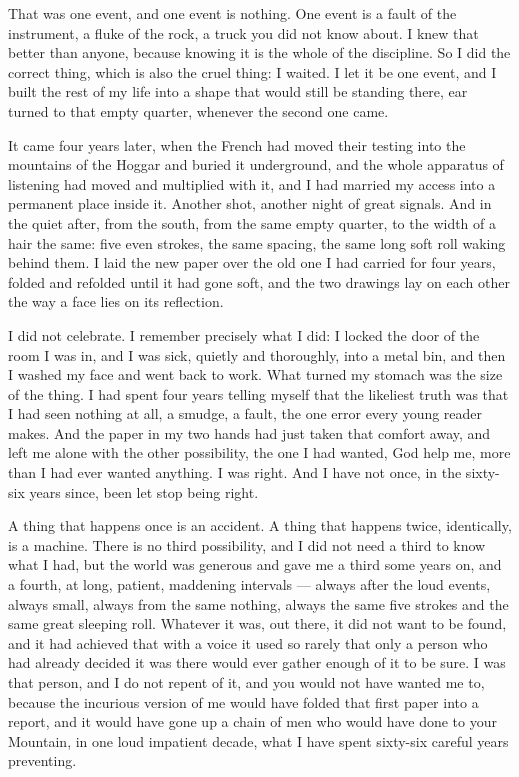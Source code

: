 \ornament

That was one event, and one event is nothing. One event is a fault of the instrument, a fluke of the rock, a truck you did not know about. I knew that better than anyone, because knowing it is the whole of the discipline. So I did the correct thing, which is also the cruel thing: I waited. I let it be one event, and I built the rest of my life into a shape that would still be standing there, ear turned to that empty quarter, whenever the second one came.\par

It came four years later, when the French had moved their testing into the mountains of the Hoggar and buried it underground, and the whole apparatus of listening had moved and multiplied with it, and I had married my access into a permanent place inside it. Another shot, another night of great signals. And in the quiet after, from the south, from the same empty quarter, to the width of a hair the same: five even strokes, the same spacing, the same long soft roll waking behind them. I laid the new paper over the old one I had carried for four years, folded and refolded until it had gone soft, and the two drawings lay on each other the way a face lies on its reflection.\par

I did not celebrate. I remember precisely what I did: I locked the door of the room I was in, and I was sick, quietly and thoroughly, into a metal bin, and then I washed my face and went back to work. What turned my stomach was the size of the thing. I had spent four years telling myself that the likeliest truth was that I had seen nothing at all, a smudge, a fault, the one error every young reader makes. And the paper in my two hands had just taken that comfort away, and left me alone with the other possibility, the one I had wanted, God help me, more than I had ever wanted anything. I was right. And I have not once, in the sixty-six years since, been let stop being right.\par

A thing that happens once is an accident. A thing that happens twice, identically, is a machine. There is no third possibility, and I did not need a third to know what I had, but the world was generous and gave me a third some years on, and a fourth, at long, patient, maddening intervals --- always after the loud events, always small, always from the same nothing, always the same five strokes and the same great sleeping roll. Whatever it was, out there, it did not want to be found, and it had achieved that with a voice it used so rarely that only a person who had already decided it was there would ever gather enough of it to be sure. I was that person, and I do not repent of it, and you would not have wanted me to, because the incurious version of me would have folded that first paper into a report, and it would have gone up a chain of men who would have done to your Mountain, in one loud impatient decade, what I have spent sixty-six careful years preventing.\par

